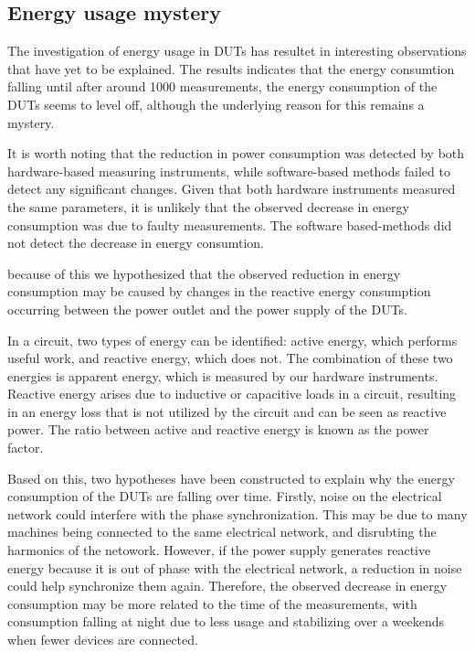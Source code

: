 \subsection{Energy usage mystery}
The investigation of energy usage in DUTs has resultet in interesting observations that have yet to be explained. The results indicates that the energy consumtion falling until after around 1000 measurements, the energy consumption of the DUTs seems to level off, although the underlying reason for this remains a mystery.

It is worth noting that the reduction in power consumption was detected by both hardware-based measuring instruments, while software-based methods failed to detect any significant changes. Given that both hardware instruments measured the same parameters, it is unlikely that the observed decrease in energy consumption was due to faulty measurements. The software based-methods did not detect the decrease in energy consumtion.

because of this we hypothesized that the observed reduction in energy consumption may be caused by changes in the reactive energy consumption occurring between the power outlet and the power supply of the DUTs.

In a circuit, two types of energy can be identified: active energy, which performs useful work, and reactive energy, which does not. The combination of these two energies is apparent energy, which is measured by our hardware instruments. Reactive energy arises due to inductive or capacitive loads in a circuit, resulting in an energy loss that is not utilized by the circuit and can be seen as reactive power\cite{ReactP}. The ratio between active and reactive energy is known as the power factor\cite{ReactP}.

Based on this, two hypotheses have been constructed to explain why the energy consumption of the DUTs are falling over time. Firstly, noise on the electrical network could interfere with the phase synchronization. This may be due to many machines being connected to the same electrical network, and disrubting the harmonics of the netowork\cite*{kullarkar2017power}. However, if the power supply generates reactive energy because it is out of phase with the electrical network, a reduction in noise could help synchronize them again. Therefore, the observed decrease in energy consumption may be more related to the time of the measurements, with consumption falling at night due to less usage and stabilizing over a weekends when fewer devices are connected.

